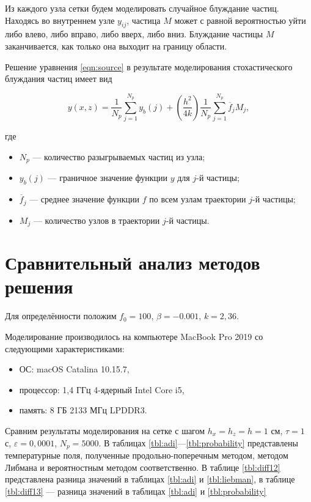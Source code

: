 \documentclass[12pt, a4paper]{article}
\begin{document}
Из каждого узла сетки будем моделировать случайное блуждание частиц.
Находясь во внутреннем узле $y_{ij}$, частица $M$ может с равной вероятностью уйти либо влево, либо вправо, либо вверх, либо вниз.
Блуждание частицы $M$ заканчивается, как только она выходит на границу области.

Решение уравнения \eqref{eqn:source} в результате моделирования стохастического блуждания частиц имеет вид

\begin{equation}
	y(x, z) = \frac{1}{N_p} \sum_{j=1}^{N_p} y_b(j) + \left( \frac{h^2}{4k} \right) \frac{1}{N_p} \sum_{j=1}^{N_p} \overline f_jM_j,
\end{equation}

\noindent где

\begin{itemize}
	\item $N_p$ — количество разыгрываемых частиц из узла;
	\item $y_b(j)$ — граничное значение функции $y$ для $j$-й частицы;
	\item $\overline f_j$ — среднее значение функции $f$ по всем узлам траектории $j$-й частицы;
	\item $M_j$ — количество узлов в траектории $j$-й частицы.
\end{itemize}

\section{Сравнительный анализ методов решения}

Для определённости положим $f_0 = 100$, $\beta = -0.001$, $k = 2,36$.

Моделирование производилось на компьютере MacBook Pro 2019 со следующими характеристиками:

\begin{itemize}
	\item ОС: macOS Catalina 10.15.7,
	\item процессор: 1,4 ГГц 4-ядерный Intel Core i5,
	\item память: 8 ГБ 2133 МГц LPDDR3.
\end{itemize}

Сравним результаты моделирования на сетке с шагом $h_x = h_z = h = 1$ см, $\tau = 1$ с, $\varepsilon = 0,0001$, $N_p = 5000$.
В таблицах \ref{tbl:adi}—\ref{tbl:probability} представлены температурные поля, полученные продольно-поперечным методом, методом Либмана и вероятностным методом соответственно.
В таблице \ref{tbl:diff12} представлена разница значений в таблицах \ref{tbl:adi} и \ref{tbl:liebman}, в таблице \ref{tbl:diff13} — разница значений в таблицах \ref{tbl:adi} и \ref{tbl:probability}
\end{document}

